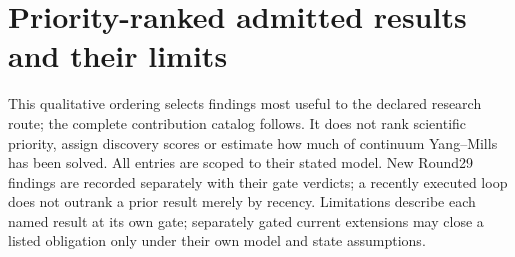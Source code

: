 \section{Priority-ranked admitted results and their limits}
\label{app:priority}
This qualitative ordering selects findings most useful to the declared research route; the complete contribution catalog follows. It does not rank scientific priority, assign discovery scores or estimate how much of continuum Yang--Mills has been solved. All entries are scoped to their stated model. New Round29 findings are recorded separately with their gate verdicts; a recently executed loop does not outrank a prior result merely by recency. Limitations describe each named result at its own gate; separately gated current extensions may close a listed obligation only under their own model and state assumptions.
\begingroup\small\setlength{\tabcolsep}{4pt}
